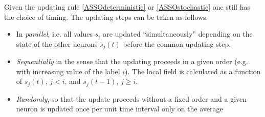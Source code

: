 Given the updating rule \eqref{ASSOdeterministic} or \eqref{ASSOstochastic} one still has the choice of timing. The updating steps can be taken as follows.
\begin{itemize}
\item In \emph{parallel}, i.e. all values $s_i$ are updated ``simultaneously'' depending on the state of the other neurons $s_j(t)$ before the common updating step.
\item \emph{Sequentially} in the sense that the updating proceeds in a given order (e.g. with increasing value of the label $i$). The local field is calculated as a function of $s_j(t)$, $j<i$, and $s_j(t-1)$, $j\geq i$.
\item \emph{Randomly}, so that the update proceeds without a fixed order and a given neuron is updated once per unit time interval only on the average
\end{itemize}

